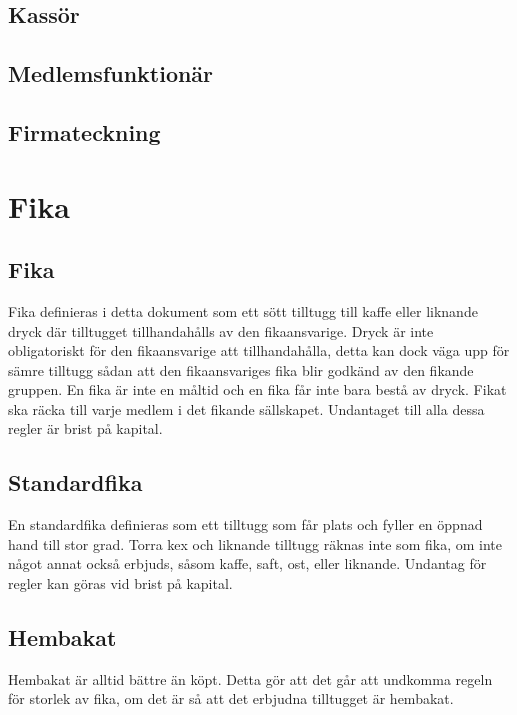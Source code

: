 \documentclass{article}
\begin{document}
\subsection{Kassör}

\subsection{Medlemsfunktionär}

\subsection{Firmateckning}

\section{Fika}
\subsection{Fika} \label{fikafika} %
Fika definieras i detta dokument som ett sött tilltugg till kaffe eller liknande
dryck där tilltugget tillhandahålls av den fikaansvarige. Dryck är inte
obligatoriskt för den fikaansvarige att tillhandahålla, detta kan dock väga upp
för sämre tilltugg sådan att den fikaansvariges fika blir godkänd av den fikande
gruppen. En fika är inte en måltid och en fika får inte bara bestå av dryck.
Fikat ska räcka till varje medlem i det fikande sällskapet. Undantaget till alla
dessa regler är brist på kapital.

\subsection{Standardfika} \label{fikastandard} %
En standardfika definieras som ett tilltugg som får plats och fyller en öppnad
hand till stor grad. Torra kex och liknande tilltugg räknas inte som fika, om
inte något annat också erbjuds, såsom kaffe, saft, ost, eller liknande. Undantag
för regler kan göras vid brist på kapital.

\subsection{Hembakat} %
Hembakat är alltid bättre än köpt. Detta gör att det går att undkomma regeln för
storlek av fika, om det är så att det erbjudna tilltugget är hembakat.
\end{document}

